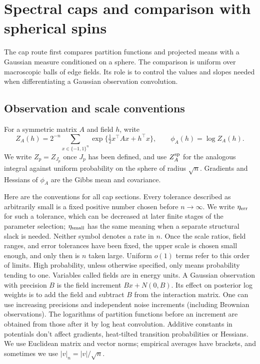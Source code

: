 \section{Spectral caps and comparison with spherical spins}\label{cap:static}
The cap route first compares partition functions and projected means with a
Gaussian measure conditioned on a sphere. The comparison is uniform over
macroscopic balls of edge fields. Its role is to control the values and slopes
needed when differentiating a Gaussian observation convolution.

\subsection{Observation and scale conventions}
For a symmetric matrix $A$ and field $h$, write
\begin{equation}\label{cap:partition-definition}
 Z_A(h)=2^{-n}\sum_{x\in\{-1,1\}^n}
       \exp\{\tfrac12 x^\top A x+h^\top x\},\qquad
 \phi_A(h)=\log Z_A(h).
\end{equation}
We write $Z_p=Z_{J_p}$ once $J_p$ has been defined, and use $Z_A^{\rm sp}$ for
the analogous integral against uniform probability on the sphere of radius
$\sqrt n$. Gradients and Hessians of $\phi_A$ are the Gibbs mean and
covariance.

Here are the conventions for all cap sections. Every tolerance described as
arbitrarily small is a fixed positive number chosen before $n\to\infty$. We
write $\eta_{\rm err}$ for such a tolerance, which can be decreased at later
finite stages of the parameter selection; $\eta_{\rm small}$ has the same
meaning when a separate structural slack is needed. Neither symbol denotes a
rate in $n$. Once the scale ratios, field ranges, and error tolerances have
been fixed, the upper scale is chosen small enough, and only then is $n$ taken
large. Uniform $o(1)$ terms refer to this order of limits. High probability,
unless otherwise specified, only means probability tending to one. Variables
called fields are in energy units. A Gaussian observation with precision \(B\)
is the field increment \(Bx+N(0,B)\). Its effect on posterior log weights is
to add the field and subtract \(B\) from the interaction matrix. One can use
increasing precisions and independent noise increments (including Brownian
observations). The logarithms of partition functions before an increment are
obtained from those after it by log heat convolution. Additive constants in
potentials don't affect gradients, heat-tilted transition probabilities or
Hessians. We use Euclidean matrix and vector norms; empirical averages have
brackets, and sometimes we use \(|v|_n=|v|/\sqrt n\).

